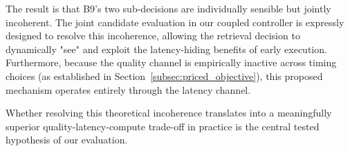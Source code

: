 The result is that B9's two sub-decisions are individually sensible but jointly incoherent. The joint candidate evaluation in our coupled controller is expressly designed to resolve this incoherence, allowing the retrieval decision to dynamically "see" and exploit the latency-hiding benefits of early execution. Furthermore, because the quality channel is empirically inactive across timing choices (as established in Section~\ref{subsec:priced_objective}), this proposed mechanism operates entirely through the latency channel. 

Whether resolving this theoretical incoherence translates into a meaningfully superior quality-latency-compute trade-off in practice is the central tested hypothesis of our evaluation.